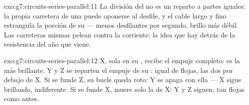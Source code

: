 \begin{solution}{exo:g7:circuits-series-parallel:11}
La división del  no es un reparto a partes iguales: la propia
carretera de una  puede oponerse al desfile, y el cable largo
y fino estrangula la porción de su  --- menos desfilantes por
segundo, brillo más débil. Las carreteras mismas pelean contra la
corriente: la idea que hay detrás de la resistencia del año que viene.
\end{solution}

\begin{solution}{exo:g7:circuits-series-parallel:12}
X, sola en su , recibe el empuje completo: es la más brillante.
Y y Z se reparten  el empuje de su : igual de
flojas, las dos por debajo de X. Si se funde Z, su bucle queda roto: Y
se apaga con ella --- X sigue brillando, indiferente. Si se funde X,
muere solo la  de X: Y y Z siguen, tan flojas como antes.
\end{solution}

